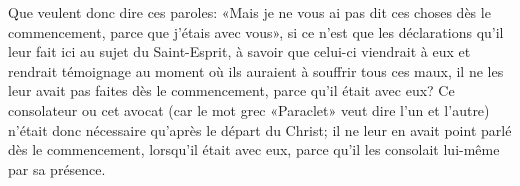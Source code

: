 Que veulent donc dire ces paroles:
	«Mais je ne vous ai pas dit ces choses dès le commencement,
	parce que j’étais avec vous»,
	si ce n’est que les déclarations qu’il leur fait ici
		au sujet du Saint-Esprit,
	à savoir que celui-ci viendrait à eux
	et rendrait témoignage au moment où ils auraient à souffrir tous ces maux,
	il ne les leur avait pas faites dès le commencement,
	parce qu’il était avec eux?
Ce consolateur ou cet avocat
	(car le mot grec «Paraclet» veut dire l’un et l’autre)
	n’était donc nécessaire qu’après le départ du Christ;
	il ne leur en avait point parlé dès le commencement,
	lorsqu’il était avec eux,
	parce qu’il les consolait lui-même par sa présence.
